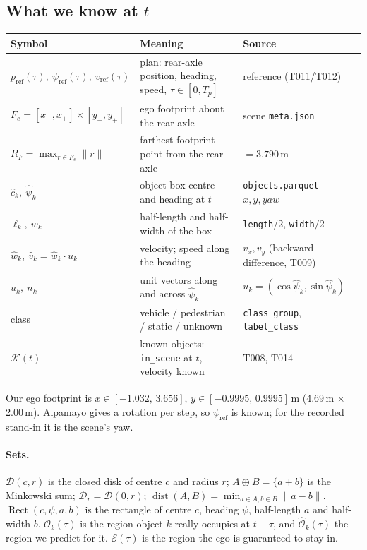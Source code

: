 \documentclass[11pt]{article}
\theoremstyle{definition}
\theoremstyle{remark}
\newcommand{\Disk}{\mathcal{D}}
\newcommand{\Occ}{\mathcal{O}}
\newcommand{\Ohat}{\widehat{\mathcal{O}}}
\newcommand{\Ego}{\mathcal{E}}
\newcommand{\pref}{p_{\mathrm{ref}}}
\newcommand{\psiref}{\psi_{\mathrm{ref}}}
\newcommand{\vref}{v_{\mathrm{ref}}}
\DeclareMathOperator{\dist}{dist}
\DeclareMathOperator{\Rect}{Rect}
\begin{document}
\subsection{What we know at $t$}
\begin{center}
\begin{tabular}{p{4.2cm}p{6.0cm}p{4.6cm}}
\toprule
Symbol & Meaning & Source \\
\midrule
$\pref(\tau),\ \psiref(\tau),\ \vref(\tau)$ & plan: rear-axle position, heading, speed, $\tau\in[0,T_p]$ & reference (T011/T012) \\
$F_e=[x_-,x_+]\times[y_-,y_+]$ & ego footprint about the rear axle & scene \texttt{meta.json} \\
$R_F=\max_{r\in F_e}\|r\|$ & farthest footprint point from the rear axle & $=3.790$\,m \\
$\hat c_k,\ \hat\psi_k$ & object box centre and heading at $t$ & \texttt{objects.parquet} $x,y,\mathit{yaw}$ \\
$\ell_k,\ w_k$ & half-length and half-width of the box & \texttt{length}/2, \texttt{width}/2 \\
$\hat w_k,\ \hat v_k=\hat w_k\cdot u_k$ & velocity; speed along the heading & $v_x,v_y$ (backward difference, T009) \\
$u_k,\ n_k$ & unit vectors along and across $\hat\psi_k$ & $u_k=(\cos\hat\psi_k,\sin\hat\psi_k)$ \\
class & vehicle / pedestrian / static / unknown & \texttt{class\_group}, \texttt{label\_class} \\
$\mathcal K(t)$ & known objects: \texttt{in\_scene} at $t$, velocity known & T008, T014 \\
\bottomrule
\end{tabular}
\end{center}
Our ego footprint is $x\in[-1.032,\,3.656]$, $y\in[-0.9995,\,0.9995]$\,m (4.69\,m $\times$ 2.00\,m).
Alpamayo gives a rotation per step, so $\psiref$ is known; for the recorded stand-in it is the scene's
yaw.

\paragraph{Sets.} $\Disk(c,r)$ is the closed disk of centre $c$ and radius $r$; $A\oplus B=\{a+b\}$ is
the Minkowski sum; $\Disk_r=\Disk(0,r)$; $\dist(A,B)=\min_{a\in A,b\in B}\|a-b\|$.
$\Rect(c,\psi,a,b)$ is the rectangle of centre $c$, heading $\psi$, half-length $a$ and half-width $b$.
$\Occ_k(\tau)$ is the region object $k$ really occupies at $t+\tau$, and $\Ohat_k(\tau)$ the region we
predict for it. $\Ego(\tau)$ is the region the ego is guaranteed to stay in.
\end{document}

